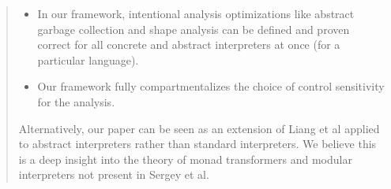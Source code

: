 \documentclass[nocopyrightspace,preprint,10pt]{sigplanconf}
\begin{document}
\begin{quote}
\begin{itemize}
\item In our framework, intentional analysis optimizations like abstract garbage
  collection and shape analysis can be defined and proven correct for all
  concrete and abstract interpreters at once (for a particular language).

\item Our framework fully compartmentalizes the choice of control sensitivity for the
  analysis.
\end{itemize}

Alternatively, our paper can be seen as an extension of Liang et al
\cite{dvanhorn:Liang1995Monad} applied to abstract interpreters rather
than standard interpreters. We believe this is a deep insight into the
theory of monad transformers and modular interpreters not present in
Sergey et al.
\end{quote}
\end{document}
